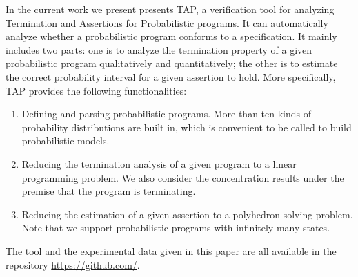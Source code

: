 \documentclass[sigconf,review, anonymous]{acmart}
\begin{document}
In the current work we present presents TAP, a verification tool  for analyzing Termination and Assertions for Probabilistic programs. It can automatically analyze whether a probabilistic program conforms to a specification.
It mainly includes two parts: one is to analyze the termination property of a given probabilistic program qualitatively and quantitatively; the other is to estimate the correct probability interval for a given assertion to hold.
More specifically, TAP provides the following functionalities:
\begin{enumerate}
\item Defining and parsing probabilistic programs. More than ten kinds of probability distributions are built in, which is convenient to be called to build probabilistic models.
  \item Reducing the termination analysis of a given program to a linear programming problem. We also consider the concentration results under the premise that the program is terminating.
	\item Reducing the estimation of a given assertion to a polyhedron solving problem. Note that we support probabilistic programs with infinitely many states.
	
\end{enumerate}
The tool and the experimental data given in this paper are all available in the repository \url{https://github.com/}.
\end{document}
